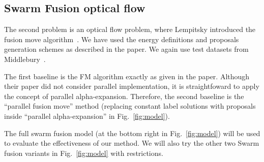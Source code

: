 \subsection{Swarm Fusion optical flow}

The second problem is an optical flow problem, where Lempitsky
introduced the fusion move algorithm~\cite{viktor}. We have used the
energy definitions and proposals generation schemes as described in the
paper. We again use test datasets from
Middlebury~\cite{middlebury_optical_flow}.

 The first baseline is the FM
algorithm exactly as given in the paper.  Although their paper did not
consider parallel implementation, it is straightfoward to apply the
concept of parallel alpha-expansion. Therefore, the second baseline is
the ``parallel fusion move'' method (replacing constant label solutions
with proposals inside ``parallel alpha-expansion'' in
Fig.~\ref{fig:model}).

The full swarm fusion model (at the bottom right in
Fig.~\ref{fig:model}) will be used to evaluate the effectiveness of our
method. We will also try the other two Swarm fusion variants in
Fig.~\ref{fig:model} with restrictions.

